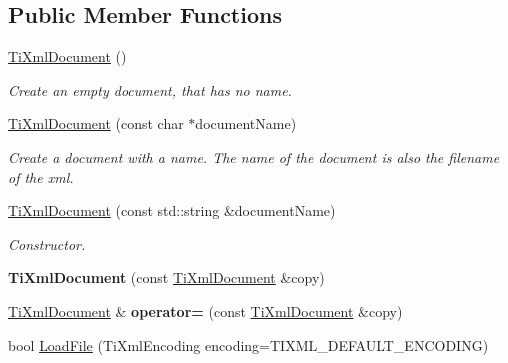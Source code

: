 \subsection*{Public Member Functions}
\begin{DoxyCompactItemize}
\item 
\hypertarget{class_ti_xml_document_a9f5e84335708fde98400230f9f12659c}{}\label{class_ti_xml_document_a9f5e84335708fde98400230f9f12659c} 
\hyperlink{class_ti_xml_document_a9f5e84335708fde98400230f9f12659c}{Ti\+Xml\+Document} ()
\begin{DoxyCompactList}\small\item\em Create an empty document, that has no name. \end{DoxyCompactList}\item 
\hypertarget{class_ti_xml_document_ae4508b452d0c3061db085f3db27b8396}{}\label{class_ti_xml_document_ae4508b452d0c3061db085f3db27b8396} 
\hyperlink{class_ti_xml_document_ae4508b452d0c3061db085f3db27b8396}{Ti\+Xml\+Document} (const char $\ast$document\+Name)
\begin{DoxyCompactList}\small\item\em Create a document with a name. The name of the document is also the filename of the xml. \end{DoxyCompactList}\item 
\hypertarget{class_ti_xml_document_a2c6e58fb99bfa76cc613f16840022225}{}\label{class_ti_xml_document_a2c6e58fb99bfa76cc613f16840022225} 
\hyperlink{class_ti_xml_document_a2c6e58fb99bfa76cc613f16840022225}{Ti\+Xml\+Document} (const std\+::string \&document\+Name)
\begin{DoxyCompactList}\small\item\em Constructor. \end{DoxyCompactList}\item 
\hypertarget{class_ti_xml_document_a323a7486e7da6099cdc19a5ff7e74b07}{}\label{class_ti_xml_document_a323a7486e7da6099cdc19a5ff7e74b07} 
{\bfseries Ti\+Xml\+Document} (const \hyperlink{class_ti_xml_document}{Ti\+Xml\+Document} \&copy)
\item 
\hypertarget{class_ti_xml_document_aa56fd4dbe8917d2033d865909e2d737e}{}\label{class_ti_xml_document_aa56fd4dbe8917d2033d865909e2d737e} 
\hyperlink{class_ti_xml_document}{Ti\+Xml\+Document} \& {\bfseries operator=} (const \hyperlink{class_ti_xml_document}{Ti\+Xml\+Document} \&copy)
\item 
bool \hyperlink{class_ti_xml_document_a4c852a889c02cf251117fd1d9fe1845f}{Load\+File} (Ti\+Xml\+Encoding encoding=T\+I\+X\+M\+L\+\_\+\+D\+E\+F\+A\+U\+L\+T\+\_\+\+E\+N\+C\+O\+D\+I\+NG)

\end{DoxyCompactItemize}
